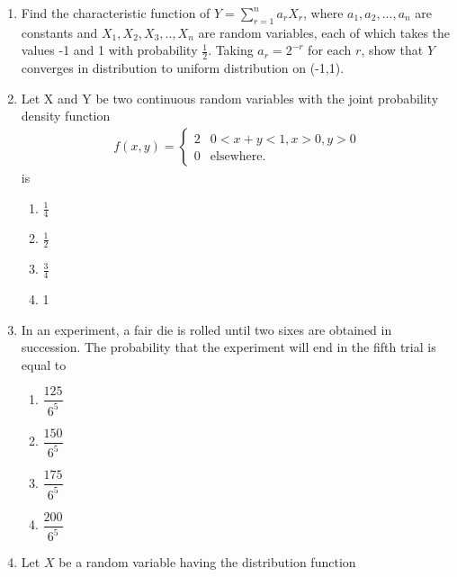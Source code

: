 \documentclass[journal,12pt,twocolumn]{IEEEtran}
\begin{document}
\begin{enumerate}
\begin{enumerate}
    \item {}\\
    \item {}\\
\end{enumerate}   
%
\solution
  
%
\item     Find the characteristic function of $Y=\sum_{r=1}^{n}a_rX_r$, where $a_1,a_2,...,a_n$ are constants and $X_1,X_2,X_3,..,X_n$ are random variables, each of which takes the values -1 and 1 with probability $\frac{1}{2}$. Taking $a_r=2^{-r}$ for each $r$, show that $Y$ converges in distribution to uniform distribution on (-1,1).
%
\solution
  
%
\item Let X and Y be two continuous random variables
with the joint probability density function
\begin{align}
    f(x,y) = 
    \begin{cases}
        2 &0<x+y<1 ,x>0,y>0\\\label{ma2011-48:equation 1}
        0 &\text{elsewhere}.
    \end{cases}
\end{align}
 is
\begin{enumerate}
    \item $\displaystyle\frac{1}{4}$\\
    \item $\displaystyle\frac{1}{2}$\\
    \item $\displaystyle\frac{3}{4}$\\
    \item 1
\end{enumerate}
%
\solution
  
%
\item In an experiment, a fair die is rolled until two sixes are obtained in succession. The probability that the experiment will end in the fifth trial is equal to\\
\begin{enumerate}[label=\alph*)]
\item $\dfrac{125}{6^{5}}$
\item $\dfrac{150}{6^{5}}$
\item $\dfrac{175}{6^{5}}$
\item $\dfrac{200}{6^{5}}$
\end{enumerate}
%
\solution
  
%
\item  Let $X$ be a random variable having the distribution function

\end{enumerate}
\end{document}
